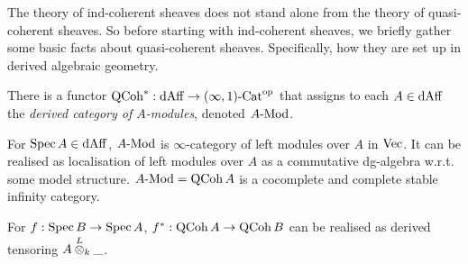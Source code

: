 \documentclass[./main.tex]{subfiles}
\begin{document}
The theory of ind-coherent sheaves does not stand alone from
the theory of quasi-coherent sheaves.
So before starting with ind-coherent sheaves,
we briefly gather some basic facts about quasi-coherent sheaves.
Specifically, how they are set up in derived algebraic geometry.
  
\begin{prop}

  There is a functor $\mathrm{QCoh}^* : \mathrm{dAff} \to (\infty,1)\text{-}\mathrm{Cat}^{\mathrm{op}}$
  that assigns to each $A \in \mathrm{dAff}$ the 
  \emph{derived category of $A$-modules}, denoted $A\text{-}\mathrm{Mod}$.

  For $\mathrm{Spec}\,A \in \mathrm{dAff}$, $A\text{-}\mathrm{Mod}$ is
  $\infty$-category of left modules over $A$ in $\mathrm{Vec}$.
  It can be realised as localisation of left modules over
  $A$ as a commutative dg-algebra w.r.t. some model structure.
  $A\text{-}\mathrm{Mod} = \mathrm{QCoh}\,A$ is a cocomplete and complete stable
  infinity category.

  For $f : \mathrm{Spec}\,B \to \mathrm{Spec}\,A$,
  $f^* : \mathrm{QCoh}\,A \to \mathrm{QCoh}\,B$ can be realised as
  derived tensoring $A \overset{L}{\otimes}_k \_$.
\end{prop}
\end{document}
